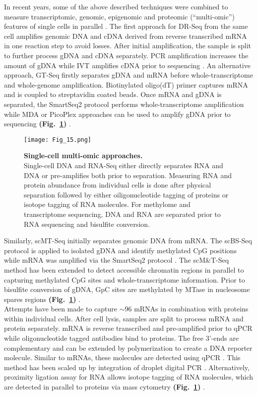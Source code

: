 In recent years, some of the above described techniques were combined to measure transcriptomic, genomic, epigenomic and proteomic (“multi-omic”) features of single cells in parallel \citep{Macaulay2017}. The first approach for \gls{DR-Seq} from the same cell amplifies genomic DNA and cDNA derived from reverse transcribed mRNA in one reaction step to avoid losses. After initial amplification, the sample is split to further process gDNA and cDNA separately. PCR amplification increases the amount of gDNA while IVT amplifies cDNA prior to sequencing \citep{Dey2015}. An alternative approach, \gls{GT-Seq} firstly separates gDNA and mRNA before whole-transcriptome and whole-genome amplification. Biotinylated oligo(dT) primer captures mRNA and is coupled to streptavidin coated beads. Once mRNA and gDNA is separated, the SmartSeq2 protocol performs whole-transcriptome amplification while MDA or PicoPlex approaches can be used to amplify gDNA prior to sequencing \textbf{(Fig.~\ref{fig0:multiomics})} \citep{Macaulay2015}.\\

\begin{figure}[!h]
\centering
\texttt{[image: Fig\_15.png]}
\caption[Single-cell multi-omic approaches]{\textbf{Single-cell multi-omic approaches.}\\
Single-cell DNA and RNA-Seq either directly separates RNA and DNA or pre-amplifies both prior to separation. Measuring RNA and protein abundance from individual cells is done after physical separation followed by either oiligonucleotide tagging of proteins or isotope tagging of RNA molecules. For methylome and transcriptome sequencing, DNA and RNA are separated prior to RNA sequencing and bisulfite conversion.}
\label{fig0:multiomics}
\end{figure}

Similarly, \gls{scMT-Seq} initially separates genomic DNA from mRNA. The scBS-Seq protocol is applied to isolated gDNA and identify methylated CpG positions while mRNA was amplified via the SmartSeq2 protocol \citep{Angermueller2016a}. The scM\&{}T-Seq method has been extended to detect accessible chromatin regions in parallel to capturing methylated CpG sites and whole-transcriptome information. Prior to bisulfite conversion of gDNA, GpC sites are methylated by MTase in nucleosome spares regions \textbf{(Fig.~\ref{fig0:multiomics})} \citep{Pott2017, Clark2018}.\\
 
Attempts have been made to capture $\sim$96 mRNAs in combination with proteins within individual cells. After cell lysis, samples are split to process mRNA and protein separately. mRNA is reverse transcribed and pre-amplified prior to \gls{qPCR} while oligonucleotide tagged antibodies bind to proteins. The free 3’-ends are complementary and can be extended by polymerization to create a DNA reporter molecule. Similar to mRNAs, these molecules are detected using qPCR \citep{Darmanis2016}. This method has been scaled up by integration of droplet digital PCR \citep{Albayrak2016}. Alternatively, proximity ligation assay for RNA allows isotope tagging of RNA molecules, which are detected in parallel to proteins via mass cytometry \textbf{(Fig.~\ref{fig0:multiomics})} \citep{Frei2016}.

